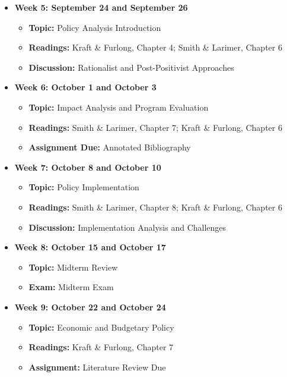 \documentclass[12pt, letterpaper]{article}
\begin{document}
\begin{itemize}
    \item \textbf{Week 5: September 24 and September 26}
    \begin{itemize}
        \item \textbf{Topic:} Policy Analysis Introduction
        \item \textbf{Readings:} Kraft \& Furlong, Chapter 4; Smith \& Larimer, Chapter 6
        \item \textbf{Discussion:} Rationalist and Post-Positivist Approaches
    \end{itemize}

    \item \textbf{Week 6: October 1 and October 3}
    \begin{itemize}
        \item \textbf{Topic:} Impact Analysis and Program Evaluation
        \item \textbf{Readings:} Smith \& Larimer, Chapter 7; Kraft \& Furlong, Chapter 6
        \item \textbf{Assignment Due:} Annotated Bibliography 
    \end{itemize}

    \item \textbf{Week 7: October 8 and October 10}
    \begin{itemize}
        \item \textbf{Topic:} Policy Implementation
        \item \textbf{Readings:} Smith \& Larimer, Chapter 8; Kraft \& Furlong, Chapter 6
        \item \textbf{Discussion:} Implementation Analysis and Challenges
    \end{itemize}

    \item \textbf{Week 8: October 15 and October 17}
    \begin{itemize}
        \item \textbf{Topic:} Midterm Review
        \item \textbf{Exam:} Midterm Exam
    \end{itemize}

    \item \textbf{Week 9: October 22 and October 24}
    \begin{itemize}
        \item \textbf{Topic:} Economic and Budgetary Policy
        \item \textbf{Readings:} Kraft \& Furlong, Chapter 7
        \item \textbf{Assignment:} Literature Review Due
    \end{itemize}


\end{itemize}
\end{document}
